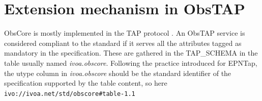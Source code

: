 \documentclass[11pt,a4paper]{ivoa}
\begin{document}
% 

 \section{Extension mechanism in ObsTAP }
 \label{sec:comext}
 ObsCore is mostly implemented in the TAP protocol \citep{2019ivoa.spec.0927D}.
 An ObsTAP service is considered compliant to the standard if it serves all the attributes tagged as mandatory in the specification.
 These are gathered in the TAP\_SCHEMA in the table usually named \emph{ivoa.obscore}. 
 Following the practice introduced  for EPNTap,  the utype column in \emph{ivoa.obscore} should be the standard identifier of the specification supported by the table content, so here \texttt{ivo://ivoa.net/std/obscore\#table-1.1}
 
\end{document}
